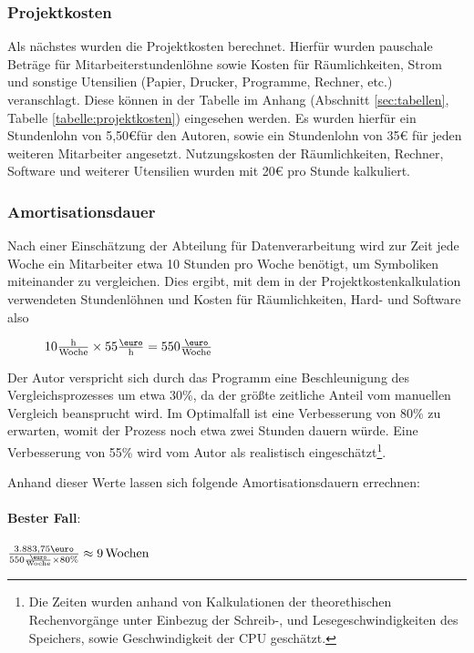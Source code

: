 \subsubsection{Projektkosten}
Als nächstes wurden die Projektkosten berechnet. Hierfür wurden pauschale Beträge 
für Mitarbeiterstundenlöhne sowie Kosten für Räumlichkeiten, Strom und sonstige Utensilien 
(Papier, Drucker, Programme, Rechner, etc.) veranschlagt. Diese können in der Tabelle im
Anhang (Abschnitt \ref{sec:tabellen}, Tabelle \ref{tabelle:projektkosten}) eingesehen werden. Es wurden hierfür
ein Stundenlohn von 5,50\euro{}für den Autoren, sowie ein Stundenlohn von 35\euro{} für jeden
weiteren Mitarbeiter angesetzt. Nutzungskosten der Räumlichkeiten, Rechner, Software
und weiterer Utensilien wurden mit 20\euro{} pro Stunde kalkuliert. \par


\subsubsection{Amortisationsdauer}
Nach einer Einschätzung der Abteilung für Datenverarbeitung wird zur Zeit jede 
Woche ein Mitarbeiter etwa 10 Stunden pro Woche benötigt, um Symboliken miteinander 
zu vergleichen. Dies ergibt, mit dem in der Projektkostenkalkulation verwendeten
Stundenlöhnen und Kosten für Räumlichkeiten, Hard- und Software also 
\begin{figure}[!htp]
 $10\frac{\text{h}}{\text{Woche}} \times 55\frac{\text{\euro}}{\text{h}} = 550\frac{\text{\euro}}{\text{Woche}}$
\end{figure}

Der Autor verspricht sich durch das Programm eine Beschleunigung des 
Vergleichsprozesses um etwa 30\%, da der größte zeitliche Anteil vom manuellen 
Vergleich beansprucht wird. Im Optimalfall ist eine Verbesserung von 80\% zu 
erwarten, womit der Prozess noch etwa zwei Stunden dauern würde. Eine Verbesserung 
von 55\% wird vom Autor als realistisch eingeschätzt\footnote{Die Zeiten wurden 
anhand von Kalkulationen der theorethischen Rechenvorgänge unter Einbezug der 
Schreib-, und Lesegeschwindigkeiten des Speichers, sowie Geschwindigkeit der CPU geschätzt.}.

Anhand dieser Werte lassen sich folgende Amortisationsdauern errechnen:\\
\\

\textbf{Bester Fall}: \\
\\
$\frac{3.883,75\text{\euro}}{550\frac{\text{\euro}}{\text{Woche}} \times 80\text{\%}} \approx 9 \text{\,Wochen}$
\\

